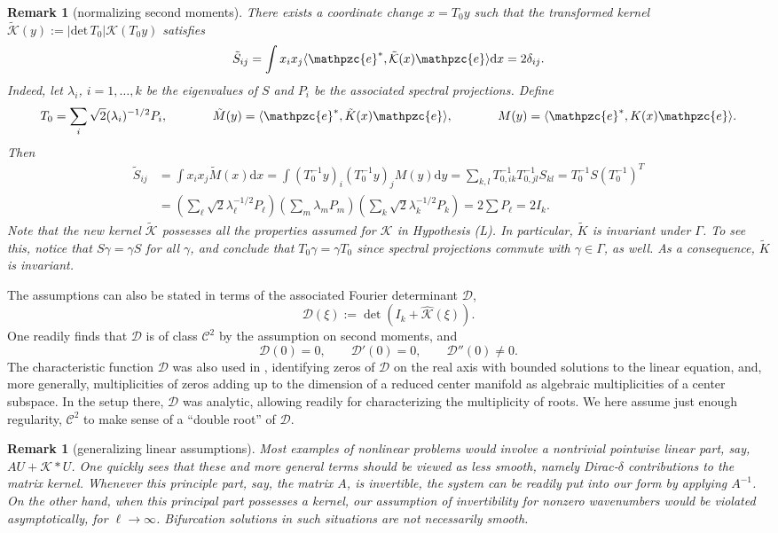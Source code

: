 \documentclass[10pt]{article}
\newtheorem{Remark}[Lemma]{Remark}
\newcommand{\rmd}{\mathrm{d}}
\newcommand{\K}{\mathcal{K}}
\newcommand{\e}{\mathpzc{e}}
\begin{document}
\begin{Remark}[normalizing second moments]\label{r:rs} There exists a coordinate change $x=T_0y$ such that the transformed kernel $\tilde{\K}(y):=|\mathrm{det}\,T_0|\K(T_0y)$ satisfies
\[
\tilde{S}_{ij}=\int x_ix_j\langle {\e}^*,\tilde{\K}(x) {\e}\rangle\rmd x=2\delta_{ij}.
\]
Indeed, let $\lambda_i$, $i=1,\ldots,k$ be the eigenvalues of $S$ and $P_i$ be the associated spectral projections. Define
\[
T_0 = \sum_{i} \sqrt{2}(\lambda_i)^{-1/2} P_i, \hspace{0.5in} \tilde{M}(y) = \langle {\e}^*, \tilde{K}(x){\e} \rangle ,\hspace{0.5in}  {M}(y) = \langle {\e}^*, {K}(x){\e} \rangle .
\]
Then
\begin{align*}
\tilde{S}_{ij} &= \int x_ix_j \tilde{M}(x) \rmd x 
= \int (T_0^{-1}y)_i(T_0^{-1}y)_jM(y)\rmd y
= \sum_{k,l}T^{-1}_{0,ik}T^{-1}_{0,jl}S_{kl}
= T_0^{-1}S(T_0^{-1})^{T}\\
&=\left(\sum_\ell \sqrt{2}\lambda_\ell^{-1/2}P_\ell\right)\left(\sum_m \lambda_m P_m\right)\left(\sum_k \sqrt{2}\lambda_k^{-1/2}P_k\right)=2\sum P_\ell=2I_k.
\end{align*}
Note that the new kernel $\tilde{\K}$ possesses all the properties assumed for $\K$ in Hypothesis (L). In particular, $\tilde{K}$ is invariant under $\Gamma$. To see this, notice that $S\gamma=\gamma S$ for all $\gamma$, and conclude that $T_0\gamma=\gamma T_0$ since spectral projections commute with $\gamma\in\Gamma$, as well. As a consequence, $\tilde{K}$ is invariant. 
\end{Remark}

The assumptions can also be stated in terms of the associated Fourier determinant $\mathcal{D}$,
\[
\mathcal{D}(\xi):=\det(I_k+\widehat{\K}(\xi)).
\]
One readily finds that $\mathcal{D}$ is of class $\mathscr{C}^2$ by the assumption on second moments, and 
\[
\mathcal{D}(0)=0,\qquad  \mathcal{D}'(0)=0, \qquad  \mathcal{D}''(0)\neq 0.
\]
The characteristic function $\mathcal{D}$ was also used in \cite{FScmfd}, identifying zeros of $\mathcal{D}$ on the real axis with bounded solutions to the linear equation, and, more generally, multiplicities of zeros adding up to the dimension of a reduced center manifold as algebraic multiplicities of a center subspace. In the setup there, $\mathcal{D}$ was analytic, allowing readily for characterizing the multiplicity of roots. We here assume just enough regularity, $\mathscr{C}^2$ to make sense of a ``double root'' of $\mathcal{D}$.

\begin{Remark}[generalizing linear assumptions]\label{r:gl}
Most examples of nonlinear problems would involve a nontrivial pointwise linear part, say, $AU+\K*U$. One quickly sees that these and more general terms should be viewed as less smooth, namely Dirac-$\delta$ contributions to the matrix kernel. Whenever this principle part, say, the matrix $A$, is invertible, the system can be readily put into our form by applying $A^{-1}$. On the other hand, when this principal part possesses a kernel, our assumption of invertibility for nonzero wavenumbers would be violated asymptotically, for $\ell\to\infty$. Bifurcation solutions in such situations are not necessarily smooth. 
\end{Remark}
\end{document}
